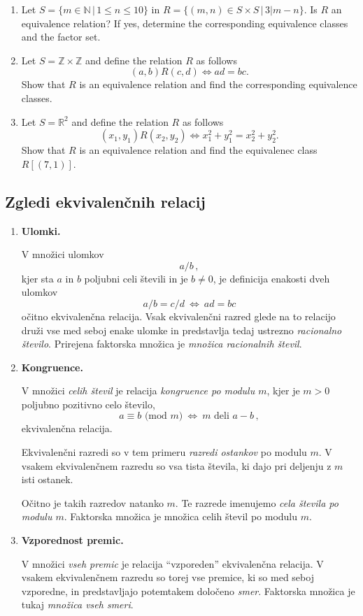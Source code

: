 \documentclass[11pt,paper=b5,footinclude,headinclude]{scrbook} %
\def\cee {{~\Leftrightarrow~}}
\begin{document}
\begin{enumerate}
\item Let $S= \{m\in \mathbb{N}\,|\, 1\leq n \leq 10\}$ in $R=\{(m,n)\in S\times S\,|\, 3|m-n\}$.
Is $R$ an equivalence relation? If yes, determine the corresponding equivalence classes and the factor set.

\item Let $S = \mathbb{Z}\times \mathbb{Z}$ and define the relation $R$ as follows
$$(a,b)R(c,d)\Leftrightarrow ad = bc.$$
Show that $R$ is an equivalence relation  and find the corresponding equivalence classes.

\item Let  $S =  \mathbb{R}^2$ and define the relation $R$ as follows
$$(x_1,y_1)R(x_2,y_2)\Leftrightarrow x_1^2 + y_1^2 = x_2^2 + y_2^2.$$
Show that $R$ is an equivalence relation  and find the equivalenec class $R[(7,1)]$.

\end{enumerate}

\subsection{Zgledi ekvivalenčnih relacij}

\begin{enumerate}
  \item \textbf{ Ulomki.}

  V množici ulomkov $$a/b\,,$$
  kjer sta $a$ in $b$ poljubni celi števili in je $b\neq 0$, je definicija enakosti dveh ulomkov
  $$a/b = c/d \cee ad = bc$$
  očitno ekvivalenčna relacija. Vsak ekvivalenčni razred glede na to relacijo druži vse med seboj enake ulomke in predstavlja tedaj ustrezno {\em racionalno število}. Prirejena faktorska množica je {\em množica racionalnih števil}.
  \item \textbf{ Kongruence.}


  V množici {\em celih števil} je relacija {\em kongruence po modulu $m$}, kjer je $m> 0$ poljubno pozitivno celo število, $$a\equiv b \textrm{ (mod $m$)}\cee m \textrm{ deli }a-b\,,$$
  ekvivalenčna relacija.

  Ekvivalenčni razredi so v tem primeru {\em razredi ostankov} po modulu $m$. V vsakem ekvivalenčnem razredu so vsa tista števila, ki dajo pri deljenju z $m$ isti ostanek.

  Očitno je takih razredov natanko $m$. Te razrede imenujemo {\em cela števila po modulu $m$}. Faktorska množica je množica celih števil po modulu $m$.

  \item \textbf{ Vzporednost premic.}

V množici {\em vseh premic} je relacija ``vzporeden'' ekvivalenčna relacija. V vsakem ekvivalenčnem razredu so torej vse premice, ki so med seboj vzporedne, in predstavljajo potemtakem določeno {\em smer}. Faktorska množica je tukaj {\em množica vseh smeri}.
\end{enumerate}
\end{document}
